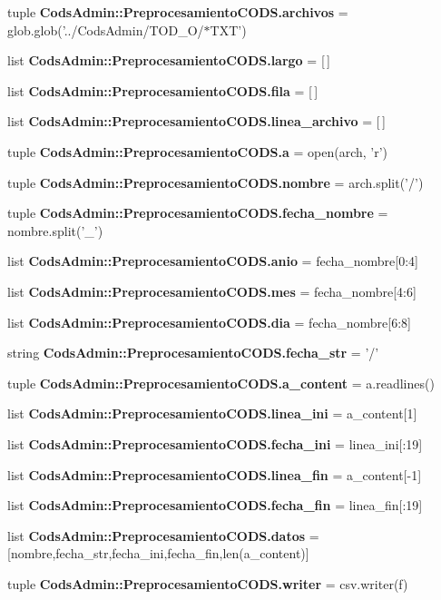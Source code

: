\begin{DoxyCompactItemize}
\item 
tuple {\bf \-Cods\-Admin\-::\-Preprocesamiento\-C\-O\-D\-S.\-archivos} = glob.\-glob('../\-Cods\-Admin/\-T\-O\-D\-\_\-\-O/$\ast$\-T\-X\-T')
\item 
list {\bf \-Cods\-Admin\-::\-Preprocesamiento\-C\-O\-D\-S.\-largo} = [$\,$]
\item 
list {\bf \-Cods\-Admin\-::\-Preprocesamiento\-C\-O\-D\-S.\-fila} = [$\,$]
\item 
list {\bf \-Cods\-Admin\-::\-Preprocesamiento\-C\-O\-D\-S.\-linea\-\_\-archivo} = [$\,$]
\item 
tuple {\bf \-Cods\-Admin\-::\-Preprocesamiento\-C\-O\-D\-S.\-a} = open(arch, 'r')
\item 
tuple {\bf \-Cods\-Admin\-::\-Preprocesamiento\-C\-O\-D\-S.\-nombre} = arch.\-split('/')
\item 
tuple {\bf \-Cods\-Admin\-::\-Preprocesamiento\-C\-O\-D\-S.\-fecha\-\_\-nombre} = nombre.\-split('\-\_\-')
\item 
list {\bf \-Cods\-Admin\-::\-Preprocesamiento\-C\-O\-D\-S.\-anio} = fecha\-\_\-nombre[0\-:4]
\item 
list {\bf \-Cods\-Admin\-::\-Preprocesamiento\-C\-O\-D\-S.\-mes} = fecha\-\_\-nombre[4\-:6]
\item 
list {\bf \-Cods\-Admin\-::\-Preprocesamiento\-C\-O\-D\-S.\-dia} = fecha\-\_\-nombre[6\-:8]
\item 
string {\bf \-Cods\-Admin\-::\-Preprocesamiento\-C\-O\-D\-S.\-fecha\-\_\-str} = '/'
\item 
tuple {\bf \-Cods\-Admin\-::\-Preprocesamiento\-C\-O\-D\-S.\-a\-\_\-content} = a.\-readlines()
\item 
list {\bf \-Cods\-Admin\-::\-Preprocesamiento\-C\-O\-D\-S.\-linea\-\_\-ini} = a\-\_\-content[1]
\item 
list {\bf \-Cods\-Admin\-::\-Preprocesamiento\-C\-O\-D\-S.\-fecha\-\_\-ini} = linea\-\_\-ini[\-:19]
\item 
list {\bf \-Cods\-Admin\-::\-Preprocesamiento\-C\-O\-D\-S.\-linea\-\_\-fin} = a\-\_\-content[-\/1]
\item 
list {\bf \-Cods\-Admin\-::\-Preprocesamiento\-C\-O\-D\-S.\-fecha\-\_\-fin} = linea\-\_\-fin[\-:19]
\item 
list {\bf \-Cods\-Admin\-::\-Preprocesamiento\-C\-O\-D\-S.\-datos} = [nombre,fecha\-\_\-str,fecha\-\_\-ini,fecha\-\_\-fin,len(a\-\_\-content)]
\item 
tuple {\bf \-Cods\-Admin\-::\-Preprocesamiento\-C\-O\-D\-S.\-writer} = csv.\-writer(f)
\end{DoxyCompactItemize}
